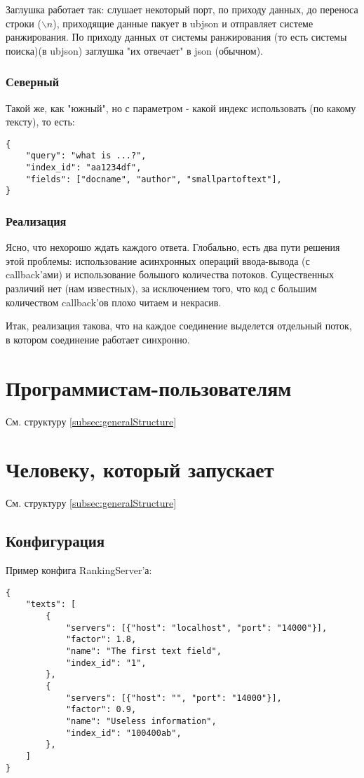 \documentclass[12pt,a4paper]{article}
\begin{document}
Заглушка работает так: слушает некоторый порт, по приходу данных, до переноса строки ($\backslash n$), приходящие данные пакует в ubjson и отправляет системе ранжирования. По приходу данных от системы ранжирования (то есть системы поиска)(в ubjson) заглушка "их отвечает" в json (обычном).

\subsubsection{Северный}
Такой же, как "южный", но с параметром - какой индекс использовать (по какому тексту), то есть:
\begin{verbatim}
{
	"query": "what is ...?",
	"index_id": "aa1234df",
	"fields": ["docname", "author", "smallpartoftext"],
}
\end{verbatim}
 

\subsubsection{Реализация}
Ясно, что нехорошо ждать каждого ответа. 
Глобально, есть два пути решения этой проблемы: использование асинхронных операций ввода-вывода (с callback'ами) и использование большого количества потоков. Существенных различий нет (нам известных), за исключением того, что код с большим количеством callback'ов плохо читаем и некрасив.

Итак, реализация такова, что на каждое соединение выделется отдельный поток, в котором соединение работает синхронно.

\section{Программистам-пользователям}
См. структуру \ref{subsec:generalStructure}

\section{Человеку, который запускает}
См. структуру \ref{subsec:generalStructure}
\subsection{Конфигурация}
Пример конфига RankingServer'а:
\begin{verbatim}
{
	"texts": [
		{
			"servers": [{"host": "localhost", "port": "14000"}],
			"factor": 1.8,
			"name": "The first text field",
			"index_id": "1",
		},
		{
			"servers": [{"host": "", "port": "14000"}],
			"factor": 0.9,
			"name": "Useless information",
			"index_id": "100400ab",
		},
	]
}
\end{verbatim}
\end{document}
